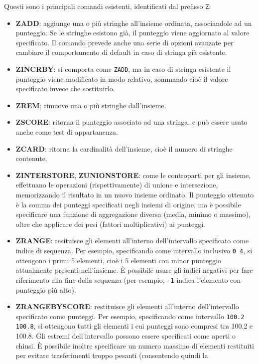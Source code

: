 Questi sono i principali comandi esistenti, identificati dal prefisso \verb|Z|:

\begin{itemize}
	\item \textbf{ZADD}: aggiunge una o più stringhe all'insieme ordinata, associandole ad un
	punteggio. Se le stringhe esistono già, il punteggio viene aggiornato al valore specificato. Il
	comando prevede anche una serie di opzioni avanzate per cambiare il comportamento di default in
	caso di stringa già esistente.
	\item \textbf{ZINCRBY}: si comporta come \verb|ZADD|, ma in caso di stringa esistente il
	punteggio viene modificato in modo relativo, sommando cioè il valore specificato invece che
	sostituirlo.
	\item \textbf{ZREM}: rimuove una o più stringhe dall'insieme.
	\item \textbf{ZSCORE}: ritorna il punteggio associato ad una stringa, e può essere usato anche
	come test di appartanenza.
	\item \textbf{ZCARD}: ritorna la cardinalità dell'insieme, cioè il numero di stringhe
	contenute.
	\item \textbf{ZINTERSTORE}, \textbf{ZUNIONSTORE}: come le controparti per gli insieme,
	effettuano le operazioni (rispettivamente) di unione e intersezione, memorizzando il risultato
	in un nuovo insieme ordinato. Il punteggio ottenuto è la somma dei punteggi specificati negli
	insiemi di origine, ma è possibile specificare una funzione di aggregazione diversa (media,
	minimo o massimo), oltre che applicare dei pesi (fattori moltiplicativi) ai punteggi.
	\item \textbf{ZRANGE}: resituisce gli elementi all'interno dell'intervallo specificato come
	indice di sequenza. Per esempio, specificando come intervallo inclusivo \verb|0 4|, si
	ottengono i primi 5 elementi, cioè i 5 elementi con minor punteggio attualmente presenti
	nell'insieme. È possibile usare gli indici negativi per fare riferimento alla fine della
	sequenza (per esempio, \verb|-1| indica l'elemento con punteggio più alto).
	\item \textbf{ZRANGEBYSCORE}: restituisce gli elementi all'interno dell'intervallo specificato
	come punteggi. Per esempio, specificando come intervallo \verb|100.2 100.8|, si ottengono tutti
	gli elementi i cui punteggi sono compresi tra 100.2 e 100.8. Gli estremi dell'intervallo
	possono essere specificati come aperti o chiusi. È possibile inoltre specificare un numero
	massimo di elementi restituiti per evitare trasferimenti troppo pesanti (consentendo quindi la

\end{itemize}
